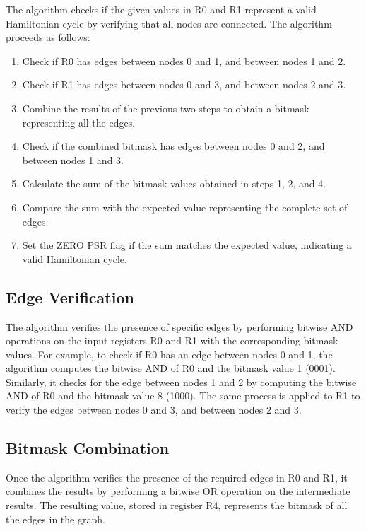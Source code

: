 {The algorithm checks if the given values in R0 and R1 represent a valid Hamiltonian cycle by verifying that all nodes are connected. The algorithm proceeds as follows:

\begin{enumerate}
    \item Check if R0 has edges between nodes 0 and 1, and between nodes 1 and 2.
    \item Check if R1 has edges between nodes 0 and 3, and between nodes 2 and 3.
    \item Combine the results of the previous two steps to obtain a bitmask representing all the edges.
    \item Check if the combined bitmask has edges between nodes 0 and 2, and between nodes 1 and 3.
    \item Calculate the sum of the bitmask values obtained in steps 1, 2, and 4.
    \item Compare the sum with the expected value representing the complete set of edges.
    \item Set the ZERO PSR flag if the sum matches the expected value, indicating a valid Hamiltonian cycle.
\end{enumerate}

\subsection{Edge Verification}

The algorithm verifies the presence of specific edges by performing bitwise AND operations on the input registers R0 and R1 with the corresponding bitmask values. For example, to check if R0 has an edge between nodes 0 and 1, the algorithm computes the bitwise AND of R0 and the bitmask value 1 (0001). Similarly, it checks for the edge between nodes 1 and 2 by computing the bitwise AND of R0 and the bitmask value 8 (1000). The same process is applied to R1 to verify the edges between nodes 0 and 3, and between nodes 2 and 3.

\subsection{Bitmask Combination}

Once the algorithm verifies the presence of the required edges in R0 and R1, it combines the results by performing a bitwise OR operation on the intermediate results. The resulting value, stored in register R4, represents the bitmask of all the edges in the graph.

}
